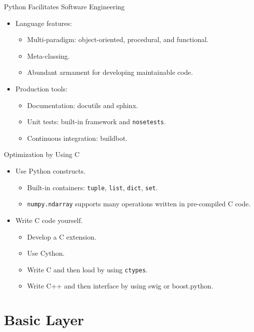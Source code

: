 \documentclass[dvips,xcolor=pst]{beamer}
\begin{document}
\begin{frame}{
%
Python Facilitates Software Engineering
%
}
\begin{itemize} \large
  \item Language features:
  \begin{itemize} \large
    \item Multi-paradigm: object-oriented, procedural, and functional.
    \item Meta-classing.
    \item Abundant armament for developing maintainable code.
  \end{itemize}
  \item Production tools:
  \begin{itemize} \large
    \item Documentation: docutils and sphinx.
    \item Unit tests: built-in framework and \texttt{nosetests}.
    \item Continuous integration: buildbot.
  \end{itemize}
\end{itemize}
\end{frame}

\begin{frame}{
%
Optimization by Using C
%
}
\begin{itemize} \large
  \item Use Python constructs.
  \begin{itemize} \large
    \item Built-in containers: \texttt{tuple}, \texttt{list}, \texttt{dict},
    \texttt{set}.
    \item \texttt{numpy.ndarray} supports many operations written in
    pre-compiled C code.
  \end{itemize}
  \item Write C code yourself.
  \begin{itemize} \large
    \item Develop a C extension.
    \item Use Cython.
    \item Write C and then load by using \texttt{ctypes}.
    \item Write C++ and then interface by using swig or boost.python.
  \end{itemize}
\end{itemize}
\end{frame}

\section{
Basic Layer
}
\end{document}
